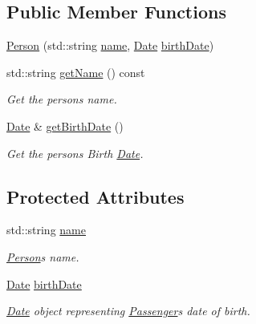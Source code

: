 \subsection*{Public Member Functions}
\begin{DoxyCompactItemize}
\item 
\mbox{\hyperlink{classPerson_aa4fc660ce27df46986187ce76481f126}{Person}} (std\+::string \mbox{\hyperlink{classPerson_a7594663aadc0de77616506df8a2f4128}{name}}, \mbox{\hyperlink{classDate}{Date}} \mbox{\hyperlink{classPerson_a7a764b56b815321eeb8412c1dcc4cabf}{birth\+Date}})
\item 
std\+::string \mbox{\hyperlink{classPerson_ab20f096fdfd5201818c45754af4c3e3b}{get\+Name}} () const
\begin{DoxyCompactList}\small\item\em Get the person\textquotesingle{}s name. \end{DoxyCompactList}\item 
\mbox{\hyperlink{classDate}{Date}} \& \mbox{\hyperlink{classPerson_a9f24821cb33c10e512eee2a5ad09c920}{get\+Birth\+Date}} ()
\begin{DoxyCompactList}\small\item\em Get the person\textquotesingle{}s Birth \mbox{\hyperlink{classDate}{Date}}. \end{DoxyCompactList}\end{DoxyCompactItemize}
\subsection*{Protected Attributes}
\begin{DoxyCompactItemize}
\item 
std\+::string \mbox{\hyperlink{classPerson_a7594663aadc0de77616506df8a2f4128}{name}}
\begin{DoxyCompactList}\small\item\em \mbox{\hyperlink{classPerson}{Person}}\textquotesingle{}s name. \end{DoxyCompactList}\item 
\mbox{\hyperlink{classDate}{Date}} \mbox{\hyperlink{classPerson_a7a764b56b815321eeb8412c1dcc4cabf}{birth\+Date}}
\begin{DoxyCompactList}\small\item\em \mbox{\hyperlink{classDate}{Date}} object representing \mbox{\hyperlink{classPassenger}{Passenger}}\textquotesingle{}s date of birth. \end{DoxyCompactList}\end{DoxyCompactItemize}


